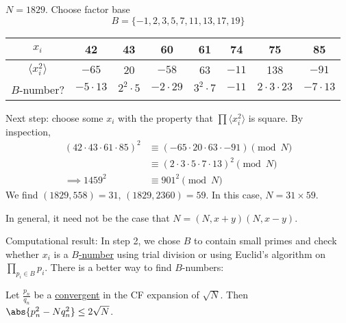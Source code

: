 \documentclass{article}
\newcommand{\cmark}{\ding{51}}
\newcommand{\xmark}{\ding{55}}
\begin{document}
\begin{eg}
    $N=1829$. Choose factor base
    \begin{equation*}B = \{-1, 2, 3, 5, 7, 11, 13, 17, 19\}\end{equation*}
    \def\arraystretch{1.5}
    \begin{center}
        \begin{tabular}{c|c|c|c|c|c|c|c}
            $x_i$ & 42 & 43 & 60 & 61 & 74 & 75 & 85 \\
            \hline
            $\langle x_i^2 \rangle$ & $-65$ & 20 & $-58$ & 63 & $-11$ & 138 & $-91$ \\
            \hline
            \multirow{2}{*}{$B$-number?} & $-5\cdot13$ & $2^2 \cdot 5$ & $-2\cdot29$ & $3^2 \cdot 7$ & $-11$ & $2 \cdot 3 \cdot 23$ & $-7 \cdot 13$ \\
                                         & \cmark      & \cmark & \xmark & \cmark & \cmark & \xmark & \cmark
        \end{tabular}
    \end{center}

    Next step: choose some $x_i$ with the property that $\prod \langle x_i^2 \rangle$ is square.
    By inspection,
    \begin{align*}
        (42 \cdot 43 \cdot 61 \cdot 85)^2 &\equiv (-65 \cdot 20 \cdot 63 \cdot -91) \pmod{N} \\
                                          &\equiv (2 \cdot 3 \cdot 5 \cdot 7 \cdot 13)^2 \pmod{N} \\
                          \implies 1459^2 &\equiv 901^2 \pmod{N}
    \end{align*}
    We find $(1829, 558)=31$, $(1829, 2360) = 59$. In this case, $N=31 \times 59$.
\end{eg}
\begin{remark}
    In general, it need not be the case that $N = (N, x+y)(N, x-y)$.
\end{remark}

Computational result: In step 2, we chose $B$ to contain small primes and check whether $x_i$ is a \hyperlink{def:factorBase}{$B$-number} using trial division or using Euclid's algorithm on $\prod_{p_i \in B} p_i$.
There is a better way to find $B$-numbers:
\begin{nlemma}\label{lem:7.9}
    Let $\frac{p_n}{q_n}$ be a \hyperlink{def:convs}{convergent} in the CF expansion of $\sqrt{N}$.
    Then $\abs{p_n^2 - N q_n^2} \leq 2 \sqrt{N}$.
\end{nlemma}
\end{document}
